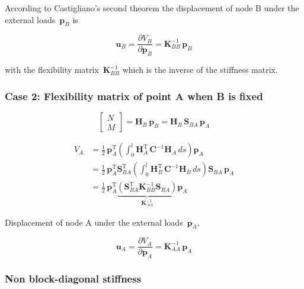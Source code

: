 According to Castigliano's second theorem the displacement of node B under the external loads~$\boldsymbol{p}_B$ is

\begin{equation}
\boldsymbol{u}_{B} = \frac{\partial V_B}{\partial \boldsymbol{p}_B} = \boldsymbol{K}_{BB}^{-1}\,\boldsymbol{p}_B
\end{equation}

with the flexibility matrix~$\boldsymbol{K}_{BB}^{-1}$ which is the inverse of the stiffness matrix.

\subsubsection*{Case 2: Flexibility matrix of point A when B is fixed}

\begin{equation}
\begin{bmatrix}
N \\ M
\end{bmatrix}
= \boldsymbol{H}_B\,\boldsymbol{p}_B = \boldsymbol{H}_B\,\boldsymbol{S}_{BA}\,\boldsymbol{p}_A
\end{equation}

\begin{align}
V_A &= \frac{1}{2}\,\boldsymbol{p}_A^\mathrm{T}
\left(\int_{0}^{l} \boldsymbol{H}_A^\mathrm{T}\,
\boldsymbol{C}^{-1}\boldsymbol{H}_A\,ds\right)
\boldsymbol{p}_A \\
&= \frac{1}{2}\,\boldsymbol{p}_A^\mathrm{T}
\boldsymbol{S}_{BA}^\mathrm{T}\left(\int_{0}^{l} \boldsymbol{H}_B^\mathrm{T}\,
\boldsymbol{C}^{-1}\boldsymbol{H}_B\,ds\right)\boldsymbol{S}_{BA}\,\boldsymbol{p}_A \\
&= \frac{1}{2}\,\boldsymbol{p}_A^\mathrm{T}
\underbrace{
\left(\boldsymbol{S}_{BA}^\mathrm{T}\boldsymbol{K}_{BB}^{-1}\boldsymbol{S}_{BA}\right)
}_{\boldsymbol{K}_{AA}^{-1}}
\boldsymbol{p}_A 
\end{align}

Displacement of node A under the external loads~$\boldsymbol{p}_A$,

\begin{equation}
\boldsymbol{u}_{A} = \frac{\partial V_A}{\partial \boldsymbol{p}_A} = \boldsymbol{K}_{AA}^{-1}\,\boldsymbol{p}_A
\end{equation}

\subsubsection*{Non block-diagonal stiffness}


